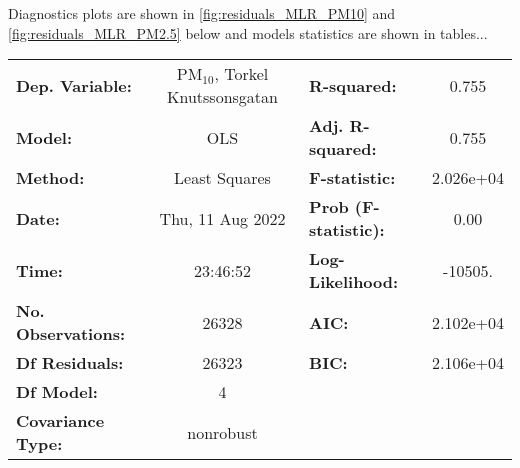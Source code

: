 Diagnostics plots are shown in \ref{fig:residuals_MLR_PM10} and \ref{fig:residuals_MLR_PM2.5} below and models statistics are shown in tables... 

%

\begin{landscape}
\begin{table}[h]
\begin{center}
\begin{tabular}{lclc}
\toprule
\textbf{Dep. Variable:}                           & PM$_{10}$, Torkel Knutssonsgatan & \textbf{  R-squared:         } &     0.755   \\
\textbf{Model:}                                   &                 OLS                 & \textbf{  Adj. R-squared:    } &     0.755   \\
\textbf{Method:}                                  &            Least Squares            & \textbf{  F-statistic:       } & 2.026e+04   \\
\textbf{Date:}                                    &           Thu, 11 Aug 2022          & \textbf{  Prob (F-statistic):} &     0.00    \\
\textbf{Time:}                                    &               23:46:52              & \textbf{  Log-Likelihood:    } &   -10505.   \\
\textbf{No. Observations:}                        &                 26328               & \textbf{  AIC:               } & 2.102e+04   \\
\textbf{Df Residuals:}                            &                 26323               & \textbf{  BIC:               } & 2.106e+04   \\
\textbf{Df Model:}                                &                     4               & \textbf{                     } &             \\
\textbf{Covariance Type:}                         &              nonrobust              & \textbf{                     } &             \\

\end{tabular}
\end{center}
\end{table}
\end{landscape}

